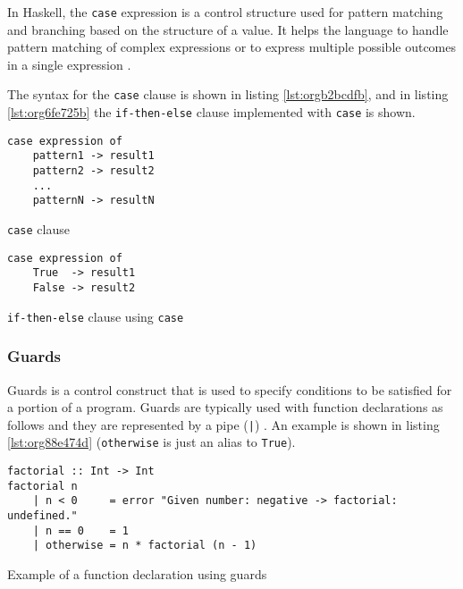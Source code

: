 \documentclass[a4paper, titlepage, twoside]{article}
\begin{document}
In Haskell, the \texttt{case} expression is a control structure used for pattern matching and branching based on the structure of a value. It helps the language to handle pattern matching of complex expressions or to express multiple possible outcomes in a single expression \autocite{kremerCPSC449Programming2015}.

The syntax for the \texttt{case} clause is shown in listing \ref{lst:orgb2bcdfb}, and in listing \ref{lst:org6fe725b} the \texttt{if-then-else} clause implemented with \texttt{case} is shown.

\begin{listing}[htbp]
\begin{verbatim}
case expression of
    pattern1 -> result1
    pattern2 -> result2
    ...
    patternN -> resultN
\end{verbatim}
\caption{\label{lst:orgb2bcdfb}\texttt{case} clause}
\end{listing}

\begin{listing}[htbp]
\begin{verbatim}
case expression of
    True  -> result1
    False -> result2
\end{verbatim}
\caption{\label{lst:org6fe725b}\texttt{if-then-else} clause using \texttt{case}}
\end{listing}

\subsubsection{Guards}
\label{sec:org251bbf3}

Guards is a control construct that is used to specify conditions to be satisfied for a portion of a program. Guards are typically used with function declarations as follows and they are represented by a pipe (\texttt{|}) \autocite{kremerCPSC449Programming2015}. An example is shown in listing \ref{lst:org88e474d} (\texttt{otherwise} is just an alias to \texttt{True}).

\begin{listing}[htbp]
\begin{verbatim}
factorial :: Int -> Int
factorial n
    | n < 0     = error "Given number: negative -> factorial: undefined."
    | n == 0    = 1
    | otherwise = n * factorial (n - 1)
\end{verbatim}
\caption{\label{lst:org88e474d}Example of a function declaration using guards}
\end{listing}
\end{document}
